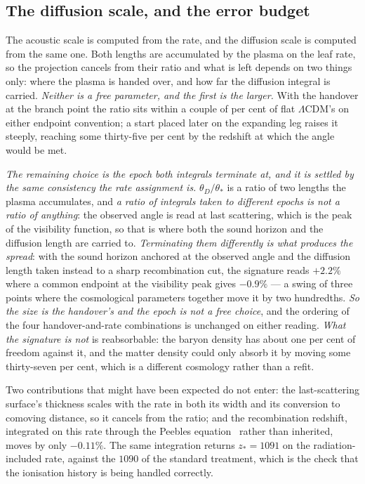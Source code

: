 \documentclass[11pt,a4paper]{article}
\theoremstyle{plain}
\theoremstyle{definition}
\theoremstyle{remark}
\begin{document}
\subsection{The diffusion scale, and the error budget}\label{sec:diffusion-scale}

The acoustic scale is computed from the rate, and the diffusion scale is computed from the same one. Both
lengths are accumulated by the plasma on the leaf rate, so the projection cancels from their ratio and what is
left depends on two things only: where the plasma is handed over, and how far the diffusion integral is
carried. \emph{Neither is a free parameter, and the first is the larger.} With the handover at the branch
point the ratio sits within a couple of per cent of flat $\Lambda$CDM's on either endpoint convention; a start placed later on the expanding leg
raises it steeply, reaching some thirty-five per cent by the redshift at which the angle would be met.

\emph{The remaining choice is the epoch both integrals terminate at, and it is settled by the same
consistency the rate assignment is.} $\theta_D/\theta_*$ is a ratio of two lengths the plasma accumulates,
and \emph{a ratio of integrals taken to different epochs is not a ratio of anything}: the observed angle is
read at last scattering, which is the peak of the visibility function, so that is where both the sound
horizon and the diffusion length are carried to. \emph{Terminating them differently is what produces the
spread}: with the sound horizon anchored at the observed angle and the diffusion length taken instead to a
sharp recombination cut, the signature reads $+2.2\%$ where a common endpoint at the visibility peak gives
$-0.9\%$ --- a swing of three points where the cosmological parameters together move it by two
hundredths. \emph{So the size is the handover's and the epoch is not a free
choice}, and the ordering of the four handover-and-rate combinations is unchanged on either reading. \emph{What the signature is not} is
reabsorbable: the baryon density has about one per cent of freedom against it, and the matter density could
only absorb it by moving some thirty-seven per cent, which is a different cosmology rather than a refit.

Two contributions that
might have been expected do not enter: the last-scattering surface's thickness scales with the rate in both
its width and its conversion to comoving distance, so it cancels from the ratio; and the recombination
redshift, integrated on this rate through the Peebles equation~\cite{Peebles1968} rather than inherited, moves by only
$-0.11\%$. The same integration returns $z_{*}=1091$ on the
radiation-included rate, against the $1090$ of the standard treatment, which is the check that the ionisation
history is being handled correctly.
\end{document}
